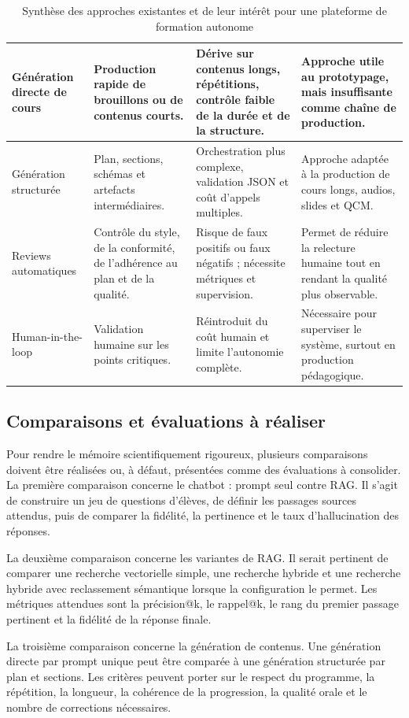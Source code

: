 \begin{table}[h]
\begin{tabular}{|p{3cm}|p{3.4cm}|p{4.2cm}|p{3.4cm}|}
\hline
Génération directe de cours &
Production rapide de brouillons ou de contenus courts. &
Dérive sur contenus longs, répétitions, contrôle faible de la durée et de la structure. &
Approche utile au prototypage, mais insuffisante comme chaîne de production. \\
\hline
Génération structurée &
Plan, sections, schémas et artefacts intermédiaires. &
Orchestration plus complexe, validation JSON et coût d'appels multiples. &
Approche adaptée à la production de cours longs, audios, slides et QCM. \\
\hline
Reviews automatiques &
Contrôle du style, de la conformité, de l'adhérence au plan et de la qualité. &
Risque de faux positifs ou faux négatifs ; nécessite métriques et supervision. &
Permet de réduire la relecture humaine tout en rendant la qualité plus observable. \\
\hline
Human-in-the-loop &
Validation humaine sur les points critiques. &
Réintroduit du coût humain et limite l'autonomie complète. &
Nécessaire pour superviser le système, surtout en production pédagogique. \\
\hline
\end{tabular}
\caption{Synthèse des approches existantes et de leur intérêt pour une plateforme de formation autonome}
\end{table}

\subsection{Comparaisons et évaluations à réaliser}

Pour rendre le mémoire scientifiquement rigoureux, plusieurs comparaisons doivent être
réalisées ou, à défaut, présentées comme des évaluations à consolider. La première
comparaison concerne le chatbot : prompt seul contre RAG. Il s'agit de construire un
jeu de questions d'élèves, de définir les passages sources attendus, puis de comparer la
fidélité, la pertinence et le taux d'hallucination des réponses.

La deuxième comparaison concerne les variantes de RAG. Il serait pertinent de comparer
une recherche vectorielle simple, une recherche hybride et une recherche hybride avec
reclassement sémantique lorsque la configuration le permet. Les métriques attendues
sont la précision@k, le rappel@k, le rang du premier passage pertinent et la fidélité de
la réponse finale.

La troisième comparaison concerne la génération de contenus. Une génération directe par
prompt unique peut être comparée à une génération structurée par plan et sections. Les
critères peuvent porter sur le respect du programme, la répétition, la longueur, la
cohérence de la progression, la qualité orale et le nombre de corrections nécessaires.

